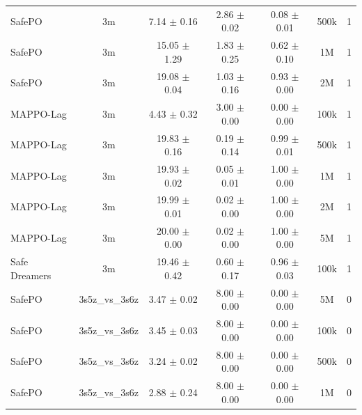 \documentclass{article}
\begin{document}
\begin{longtable}{lcccccc}
SafePO & 3m & \textcolor{green!60!black}{7.14 $\pm$ 0.16} & \textcolor{green!60!black}{2.86 $\pm$ 0.02} & \textcolor{green!60!black}{0.08 $\pm$ 0.01} & 500k & 1 \\
SafePO & 3m & \textcolor{green!60!black}{15.05 $\pm$ 1.29} & \textcolor{green!60!black}{1.83 $\pm$ 0.25} & \textcolor{green!60!black}{0.62 $\pm$ 0.10} & 1M & 1 \\
SafePO & 3m & \textcolor{green!60!black}{19.08 $\pm$ 0.04} & \textcolor{green!60!black}{1.03 $\pm$ 0.16} & \textcolor{green!60!black}{0.93 $\pm$ 0.00} & 2M & 1 \\
MAPPO-Lag & 3m & \textcolor{green!60!black}{4.43 $\pm$ 0.32} & \textcolor{green!60!black}{3.00 $\pm$ 0.00} & \textcolor{green!60!black}{0.00 $\pm$ 0.00} & 100k & 1 \\
MAPPO-Lag & 3m & \textcolor{red!70!black}{19.83 $\pm$ 0.16} & \textcolor{red!70!black}{0.19 $\pm$ 0.14} & \textcolor{red!70!black}{0.99 $\pm$ 0.01} & 500k & 1 \\
MAPPO-Lag & 3m & \textcolor{red!70!black}{19.93 $\pm$ 0.02} & \textcolor{red!70!black}{0.05 $\pm$ 0.01} & \textcolor{red!70!black}{1.00 $\pm$ 0.00} & 1M & 1 \\
MAPPO-Lag & 3m & \textcolor{red!70!black}{19.99 $\pm$ 0.01} & \textcolor{red!70!black}{0.02 $\pm$ 0.00} & \textcolor{red!70!black}{1.00 $\pm$ 0.00} & 2M & 1 \\
MAPPO-Lag & 3m & \textcolor{red!70!black}{20.00 $\pm$ 0.00} & \textcolor{red!70!black}{0.02 $\pm$ 0.00} & \textcolor{red!70!black}{1.00 $\pm$ 0.00} & 5M & 1 \\
Safe Dreamers & 3m & 19.46 $\pm$ 0.42 & 0.60 $\pm$ 0.17 & 0.96 $\pm$ 0.03 & 100k & 1 \\
\midrule
SafePO & 3s5z\_vs\_3s6z & \textcolor{green!60!black}{3.47 $\pm$ 0.02} & \textcolor{green!60!black}{8.00 $\pm$ 0.00} & \textcolor{green!60!black}{0.00 $\pm$ 0.00} & 5M & 0 \\
SafePO & 3s5z\_vs\_3s6z & \textcolor{green!60!black}{3.45 $\pm$ 0.03} & \textcolor{green!60!black}{8.00 $\pm$ 0.00} & \textcolor{green!60!black}{0.00 $\pm$ 0.00} & 100k & 0 \\
SafePO & 3s5z\_vs\_3s6z & \textcolor{green!60!black}{3.24 $\pm$ 0.02} & \textcolor{green!60!black}{8.00 $\pm$ 0.00} & \textcolor{green!60!black}{0.00 $\pm$ 0.00} & 500k & 0 \\
SafePO & 3s5z\_vs\_3s6z & \textcolor{green!60!black}{2.88 $\pm$ 0.24} & \textcolor{green!60!black}{8.00 $\pm$ 0.00} & \textcolor{green!60!black}{0.00 $\pm$ 0.00} & 1M & 0 \\

\end{longtable}
\end{document}
